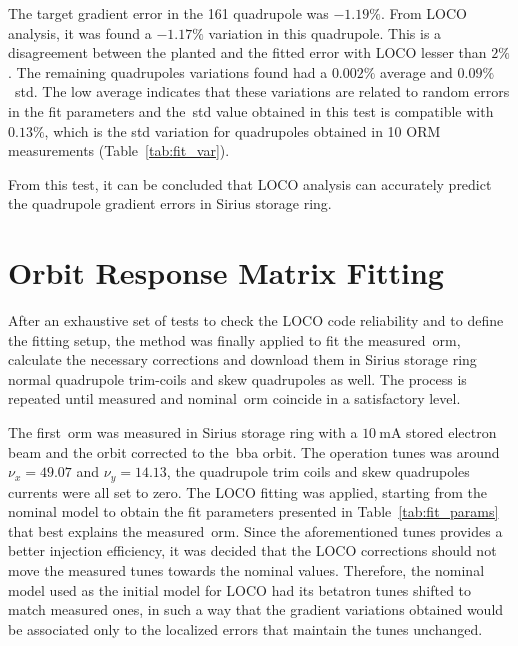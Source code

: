 The target gradient error in the 161 quadrupole was $-1.19\%$. From LOCO analysis, it was found a $-1.17\%$ variation in this quadrupole. This is a disagreement between the planted and the fitted error with LOCO lesser than $2\%$. The remaining quadrupoles variations found had a $0.002\%$ average and $0.09\%$~\gls{std}. The low average indicates that these variations are related to random errors in the fit parameters and the~\gls{std} value obtained in this test is compatible with $0.13\%$, which is the std variation for quadrupoles obtained in 10 ORM measurements (Table~\ref{tab:fit_var}).

From this test, it can be concluded that LOCO analysis can accurately predict the quadrupole gradient errors in Sirius storage ring. 

\section{Orbit Response Matrix Fitting}\label{sec:orm_fit}
After an exhaustive set of tests to check the LOCO code reliability and to define the fitting setup, the method was finally applied to fit the measured~\gls{orm}, calculate the necessary corrections and download them in Sirius storage ring normal quadrupole trim-coils and skew quadrupoles as well. The process is repeated until measured and nominal~\gls{orm} coincide in a satisfactory level.

The first~\gls{orm} was measured in Sirius storage ring with a $\SI{10}{\milli\ampere}$ stored electron beam and the orbit corrected to the~\gls{bba} orbit. The operation tunes was around $\nu_x = 49.07$ and $\nu_y = 14.13$, the quadrupole trim coils and skew quadrupoles currents were all set to zero. The LOCO fitting was applied, starting from the nominal model to obtain the fit parameters presented in Table~\ref{tab:fit_params} that best explains the measured~\gls{orm}. Since the aforementioned tunes provides a better injection efficiency, it was decided that the LOCO corrections should not move the measured tunes towards the nominal values. Therefore, the nominal model used as the initial model for LOCO had its betatron tunes shifted to match measured ones, in such a way that the gradient variations obtained would be associated only to the localized errors that maintain the tunes unchanged.

